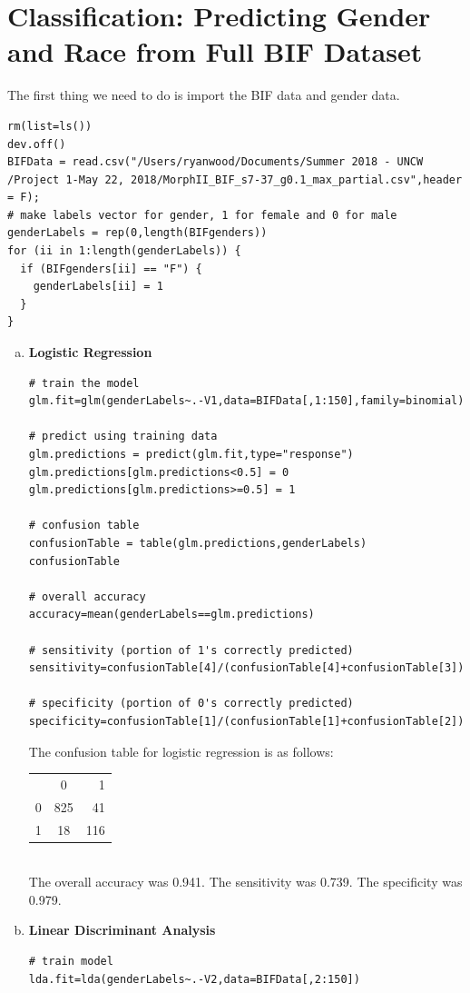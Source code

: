 \documentclass{article}
\begin{document}
\section{Classification: Predicting Gender and Race from Full BIF Dataset}
The first thing we need to do is import the BIF data and gender data.\\
\begin{verbatim}
rm(list=ls())
dev.off()
BIFData = read.csv("/Users/ryanwood/Documents/Summer 2018 - UNCW /Project 1-May 22, 2018/MorphII_BIF_s7-37_g0.1_max_partial.csv",header = F);
# make labels vector for gender, 1 for female and 0 for male
genderLabels = rep(0,length(BIFgenders))
for (ii in 1:length(genderLabels)) {
  if (BIFgenders[ii] == "F") {
    genderLabels[ii] = 1
  }
}
\end{verbatim}
\begin{enumerate}[a)]
\item \textbf{Logistic Regression}
\begin{verbatim}
# train the model
glm.fit=glm(genderLabels~.-V1,data=BIFData[,1:150],family=binomial)

# predict using training data
glm.predictions = predict(glm.fit,type="response")
glm.predictions[glm.predictions<0.5] = 0
glm.predictions[glm.predictions>=0.5] = 1

# confusion table
confusionTable = table(glm.predictions,genderLabels)
confusionTable

# overall accuracy
accuracy=mean(genderLabels==glm.predictions)

# sensitivity (portion of 1's correctly predicted)
sensitivity=confusionTable[4]/(confusionTable[4]+confusionTable[3])

# specificity (portion of 0's correctly predicted)
specificity=confusionTable[1]/(confusionTable[1]+confusionTable[2])
\end{verbatim}

The confusion table for logistic regression is as follows:\\
\begin{tabular}{l c r}
  & 0 & 1 \\
0 & 825 & 41 \\
1 & 18 & 116 \\
\end{tabular}\\
The overall accuracy was 0.941. The sensitivity was 0.739. The specificity was 0.979.\\


\item \textbf{Linear Discriminant Analysis}
\begin{verbatim}
# train model
lda.fit=lda(genderLabels~.-V2,data=BIFData[,2:150])


\end{verbatim}
\end{enumerate}
\end{document}
